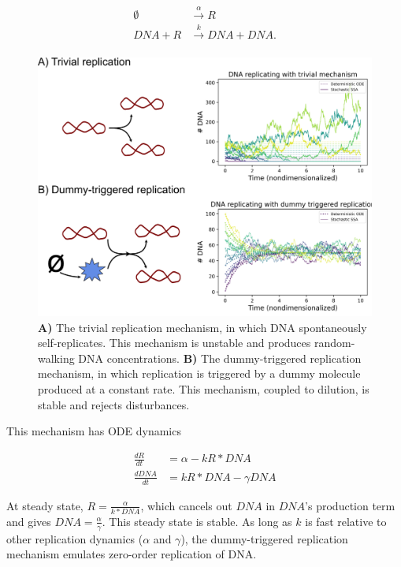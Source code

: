 \documentclass[journal = jacsat,manuscript = note]{achemso}
\begin{document}
\begin{align*}
	\emptyset &\overset{\alpha}{\to} R\\
	\mathit{DNA} + R &\overset{k}{\to} \mathit{DNA} + \mathit{DNA}.\\
\end{align*}

\begin{figure}
\centering
\includegraphics[scale=.75]{figures/models_and_traces.png}
\caption{\textbf{A)} The trivial replication mechanism, in which DNA spontaneously self-replicates. This mechanism is unstable and produces random-walking DNA concentrations. \textbf{B)} The dummy-triggered replication mechanism, in which replication is triggered by a dummy molecule produced at a constant rate. This mechanism, coupled to dilution, is stable and rejects disturbances.}
\label{fig:models_and_traces}
\end{figure}

This mechanism has ODE dynamics

\begin{align*}
\frac{dR}{dt} &= \alpha - kR*\mathit{DNA}\\
\frac{d\mathit{DNA}}{dt} &= kR*\mathit{DNA} - \gamma \mathit{DNA}
\end{align*}

At steady state, $R = \frac{\alpha}{k*\mathit{DNA}}$, which cancels out $\mathit{DNA}$ in $\mathit{DNA}$'s production term and gives $\mathit{DNA} = \frac{\alpha}{\gamma}$. This steady state is stable. As long as $k$ is fast relative to other replication dynamics ($\alpha$ and $\gamma$), the dummy-triggered replication mechanism emulates zero-order replication of DNA.
\end{document}
